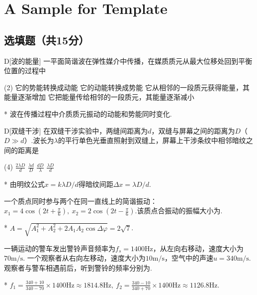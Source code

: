 \chapter{A Sample for  Template}
\fancyhead[R]{\color{H6}\kaishu\rightmark\,}

\section{选填题（共15分）}
\begin{choice}{D}[波的能量]
    一平面简谐波在弹性媒介中传播，在媒质质元从最大位移处回到平衡位置的过程中
    \begin{tasks}(2)
        \task 它的势能转换成动能
        \task 它的动能转换成势能
        \task 它从相邻的一段质元获得能量，其能量逐渐增加
        \task 它把能量传给相邻的一段质元，其能量逐渐减小
    \end{tasks}
\end{choice}
\begin{solution}*
    波在传播过程中介质质元振动的动能和势能同时变化.
\end{solution}

\begin{choice}{D}[双缝干涉]
    在双缝干涉实验中，两缝间距离为$d$，双缝与屏幕之间的距离为$D$（$D\gg d$）.波长为$\lambda$的平行单色光垂直照射到双缝上，屏幕上干涉条纹中相邻暗纹之间的距离是
    \begin{tasks}(4)
        \task $\frac{2\lambda D}{d}$
        \task $\frac{\lambda d}{D}$
        \task $\frac{dD}{\lambda}$
        \task $\frac{\lambda D}{d}$
    \end{tasks}
\end{choice}
\begin{solution}*
    由明纹公式$x=k\lambda D/d$得暗纹间距$\Delta x=\lambda D/d$.
\end{solution}

\begin{problem}[简谐振动的合成][3]
    一个质点同时参与两个在同一直线上的简谐振动：$x_1=4\cos{(2t+\frac{\pi}{6})},\ x_2=2\cos{(2t-\frac{\pi}{6})}$.该质点合振动的振幅大小为.
\end{problem}
\begin{solution}*
    $A=\sqrt{A_1^2+A_2^2+2A_1A_2\cos{\Delta\varphi}}=2\sqrt{7}$.
\end{solution}

\begin{problem}[多普勒效应][6]
    一辆运动的警车发出警铃声音频率为$f_s=1400\mathrm{Hz}$，从左向右移动，速度大小为$70\mathrm{m/s}$. 一个观察者从右向左移动，速度大小为$10\mathrm{m/s}$，空气中的声速$u=340\mathrm{m/s}$.观察者与警车相遇前后，听到警铃的频率分别为.
\end{problem}
\begin{solution}*
    $f_1=\frac{340+10}{340-70}\times 1400\mathrm{Hz}\approx 1814.8\mathrm{Hz},\ f_2=\frac{340-10}{340+70}\times 1400\mathrm{Hz}\approx 1126.8\mathrm{Hz}$.
\end{solution}

